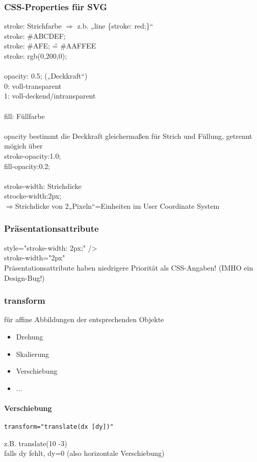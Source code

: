 \subsubsection{CSS-Properties für SVG}
stroke: Strichfarbe $\Rightarrow$ z.b. „line \{stroke: red;\}“\\
stroke: \#ABCDEF;\\
stroke: \#AFE; \^= \#AAFFEE\\
stroke: rgb(0,200,0);\\
\\
opacity: 0.5; („Deckkraft“)\\
0: voll-transparent\\
1: voll-deckend/intransparent\\
\\
fill: Füllfarbe\\
\\
opacity bestimmt die Deckkraft gleichermaßen für Strich und Füllung, getrennt mögich über\\
stroke-opacity:1.0;\\
fill-opacity:0.2;\\
\\
stroke-width: Strichdicke\\
strocke-width:2px;\\
$\Rightarrow$Strichdicke von 2„Pixeln“=Einheiten im User Coordinate System

\subsubsection{Präsentationsattribute}
style="stroke-width: 2px;" />\\
stroke-width="2px"\\
Präsentationsattribute haben niedrigere Priorität als CSS-Angaben! (IMHO ein Design-Bug!)

\subsubsection{transform}
für affine Abbildungen der entsprechenden Objekte
\begin{itemize}
\item Drehung
\item Skalierung
\item Verschiebung
\item ...
\end{itemize}
\paragraph{Verschiebung}\hspace{1mm}
\begin{lstlisting}[caption={Verschiebung mit der transform Syntax}, label={lst:text-Tag}, language={SVG}]
  transform="translate(dx [dy])"    
\end{lstlisting}
z.B. translate(10 -3)\\
falls dy fehlt, dy=0 (also horizontale Verschiebung)  

